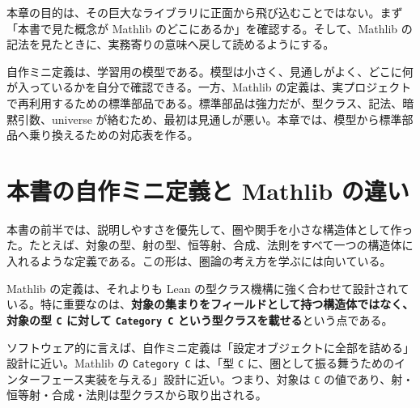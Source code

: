本章の目的は、その巨大なライブラリに正面から飛び込むことではない。まず「本書で見た概念が Mathlib のどこにあるか」を確認する。そして、Mathlib の記法を見たときに、実務寄りの意味へ戻して読めるようにする。

\begin{intuitionbox}
自作ミニ定義は、学習用の模型である。模型は小さく、見通しがよく、どこに何が入っているかを自分で確認できる。一方、Mathlib の定義は、実プロジェクトで再利用するための標準部品である。標準部品は強力だが、型クラス、記法、暗黙引数、universe が絡むため、最初は見通しが悪い。本章では、模型から標準部品へ乗り換えるための対応表を作る。
\end{intuitionbox}


\section{本書の自作ミニ定義と Mathlib の違い}

本書の前半では、説明しやすさを優先して、圏や関手を小さな構造体として作った。たとえば、対象の型、射の型、恒等射、合成、法則をすべて一つの構造体に入れるような定義である。この形は、圏論の考え方を学ぶには向いている。

Mathlib の定義は、それよりも Lean の型クラス機構に強く合わせて設計されている。特に重要なのは、\textbf{対象の集まりをフィールドとして持つ構造体ではなく、対象の型 \texttt{C} に対して \texttt{Category C} という型クラスを載せる}という点である。

\begin{softwarebox}
ソフトウェア的に言えば、自作ミニ定義は「設定オブジェクトに全部を詰める」設計に近い。Mathlib の \texttt{Category C} は、「型 \texttt{C} に、圏として振る舞うためのインターフェース実装を与える」設計に近い。つまり、対象は \texttt{C} の値であり、射・恒等射・合成・法則は型クラスから取り出される。
\end{softwarebox}

